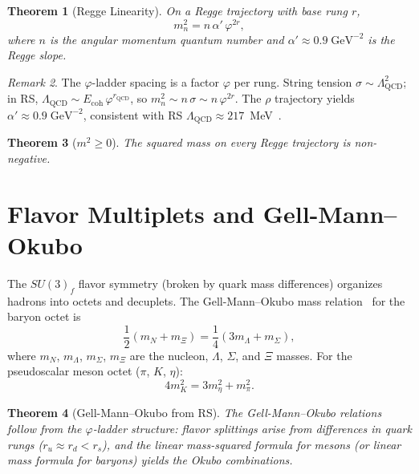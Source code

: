 \documentclass[12pt,a4paper]{article}
\newtheorem{theorem}{Theorem}[section]
\theoremstyle{definition}
\theoremstyle{remark}
\newtheorem{remark}[theorem]{Remark}
\begin{document}
\begin{theorem}[Regge Linearity]
\label{thm:regge}
On a Regge trajectory with base rung $r$,
\begin{equation}
  m_n^2 = n\,\alpha'\,\varphi^{2r},
\end{equation}
where $n$ is the angular momentum quantum number and
$\alpha' \approx 0.9\;\mathrm{GeV}^{-2}$ is the Regge slope.
\end{theorem}

\begin{remark}
The $\varphi$-ladder spacing is a factor $\varphi$ per rung.  String
tension $\sigma \sim \Lambda_{\mathrm{QCD}}^2$; in RS,
$\Lambda_{\mathrm{QCD}} \sim E_{\mathrm{coh}}\,\varphi^{r_{\mathrm{QCD}}}$,
so $m_n^2 \sim n\,\sigma \sim n\,\varphi^{2r}$.  The $\rho$ trajectory
yields $\alpha' \approx 0.9\;\mathrm{GeV}^{-2}$, consistent with RS
$\Lambda_{\mathrm{QCD}} \approx 217$~MeV~\cite{RS_QCD}.
\end{remark}

\begin{theorem}[$m^2 \geq 0$]
\label{thm:m2nonneg}
The squared mass on every Regge trajectory is non-negative.
\end{theorem}

\section{Flavor Multiplets and Gell-Mann--Okubo}\label{sec:flavor}

The $SU(3)_f$ flavor symmetry (broken by quark mass differences)
organizes hadrons into octets and decuplets.  The Gell-Mann--Okubo
mass relation~\cite{Okubo1962} for the baryon octet is
\begin{equation}
  \frac{1}{2}(m_N + m_\Xi) = \frac{1}{4}(3 m_\Lambda + m_\Sigma),
\end{equation}
where $m_N$, $m_\Lambda$, $m_\Sigma$, $m_\Xi$ are the nucleon,
$\Lambda$, $\Sigma$, and $\Xi$ masses.  For the pseudoscalar meson
octet ($\pi$, $K$, $\eta$):
\begin{equation}
  4 m_K^2 = 3 m_\eta^2 + m_\pi^2.
\end{equation}

\begin{theorem}[Gell-Mann--Okubo from RS]
\label{thm:gmo}
The Gell-Mann--Okubo relations follow from the $\varphi$-ladder
structure: flavor splittings arise from differences in quark rungs
($r_u \approx r_d < r_s$), and the linear mass-squared formula for
mesons (or linear mass formula for baryons) yields the Okubo
combinations.
\end{theorem}
\end{document}
